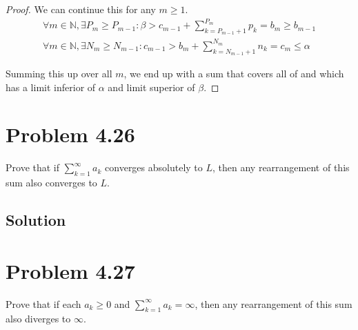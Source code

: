 \documentclass[12pt]{report}
\begin{document}
\begin{proof}
            We can continue this for any $m \geq 1$.
            \begin{gather}
                \forall m \in \mathbb{N}, \exists P_m \geq P_{m - 1} : \beta > c_{m - 1} + \sum_{k=P_{m-1}+1}^{P_m} p_k = b_m \geq b_{m - 1}\\
                \forall m \in \mathbb{N}, \exists N_m \geq N_{m - 1} : c_{m-1} > b_{m} + \sum_{k=N_{m-1}+1}^{N_m} n_k = c_m \leq \alpha
            \end{gather}

            Summing this up over all $m$, we end up with a sum that covers all of  and which has a limit inferior of $\alpha$ and limit superior of $\beta$.
        \end{proof}
    \pagebreak

\section{Problem 4.26}
    Prove that if $\sum_{k = 1}^{\infty} a_k$ converges absolutely to $L$, then any rearrangement of this sum also converges to $L$. 

    \subsection{Solution}
        

\section{Problem 4.27}
    Prove that if each $a_k \geq 0$ and $\sum_{k = 1}^{\infty} a_k = \infty$, then any rearrangement of this sum also diverges to $\infty$. 
    \pagebreak
\end{document}

